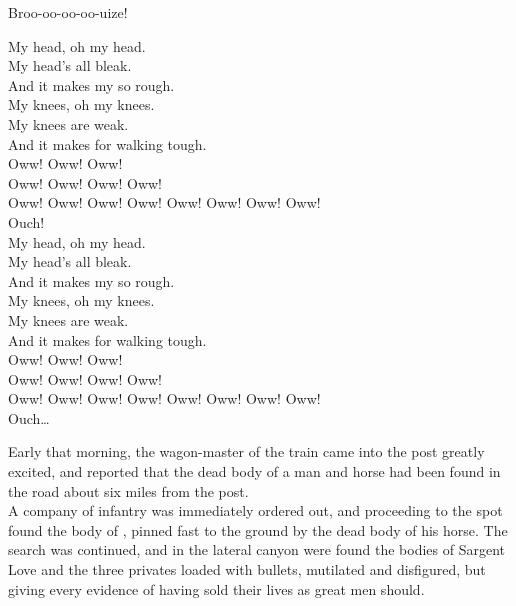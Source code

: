 Broo-oo-oo-oo-uize! \\




My head, oh my head. \\
My head's all bleak. \\
And it makes my  so rough. \\

My knees, oh my knees. \\
My knees are weak. \\
And it makes for walking tough. \\

Oww! Oww! Oww! \\
Oww! Oww! Oww! Oww! \\
Oww! Oww! Oww! Oww! Oww! Oww! Oww! Oww! \\
Ouch! \\

My head, oh my head. \\
My head's all bleak. \\
And it makes my  so rough. \\

My knees, oh my knees. \\
My knees are weak. \\
And it makes for walking tough. \\

Oww! Oww! Oww! \\
Oww! Oww! Oww! Oww! \\
Oww! Oww! Oww! Oww! Oww! Oww! Oww! Oww! \\
Ouch… \\





Early that morning, the wagon-master of the train came into the post greatly excited, and reported that the dead body of a man and horse had been found in the road about six miles from the post. \\

A company of infantry was immediately ordered out, and proceeding to the spot found the body of , pinned fast to the ground by the dead body of his horse. The search was continued, and in the lateral canyon were found the bodies of Sargent Love and the three privates loaded with bullets, mutilated and disfigured, but giving every evidence of having sold their lives as great men should. \\

